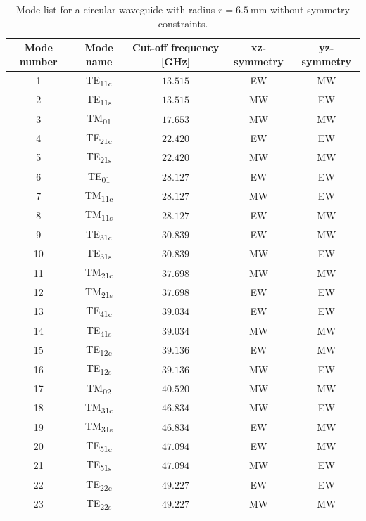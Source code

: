 \documentclass[english,twoside]{article}
\begin{document}
    
      \begin{table}[H]
        \centering		 
        \caption{Mode list for a circular waveguide with radius $r=\SI{6.5}{\milli\meter}$ without symmetry constraints.}
        \begin{tabular}{c|c|c|c|c}
          Mode number & Mode name & Cut-off frequency [GHz] & xz-symmetry & yz-symmetry\\
          \hline
          1 & TE\textsubscript{11c} & $\num{13.515}$ & EW & MW\\
          2 & TE\textsubscript{11s} & $\num{13.515}$ & MW & EW\\
          3 & TM\textsubscript{01} & $\num{17.653}$ & MW & MW\\
          4 & TE\textsubscript{21c} & $\num{22.420}$ & EW & EW\\
          5 & TE\textsubscript{21s} & $\num{22.420}$ & MW & MW\\
          6 & TE\textsubscript{01} & $\num{28.127}$ & EW & EW\\
          7 & TM\textsubscript{11c} & $\num{28.127}$ & MW & EW\\
          8 & TM\textsubscript{11s} & $\num{28.127}$ & EW & MW\\
          9 & TE\textsubscript{31c} & $\num{30.839}$ & EW & MW\\
          10 & TE\textsubscript{31s} & $\num{30.839}$ & MW & EW\\
          11 & TM\textsubscript{21c} & $\num{37.698}$ & MW & MW\\
          12 & TM\textsubscript{21s} & $\num{37.698}$ & EW & EW\\
          13 & TE\textsubscript{41c} & $\num{39.034}$ & EW & EW\\
          14 & TE\textsubscript{41s} & $\num{39.034}$ & MW & MW\\
          15 & TE\textsubscript{12c} & $\num{39.136}$ & EW & MW\\
          16 & TE\textsubscript{12s} & $\num{39.136}$ & MW & EW\\
          17 & TM\textsubscript{02} & $\num{40.520}$ & MW & MW\\
          18 & TM\textsubscript{31c} & $\num{46.834}$ & MW & EW\\
          19 & TM\textsubscript{31s} & $\num{46.834}$ & EW & MW\\
          20 & TE\textsubscript{51c} & $\num{47.094}$ & EW & MW\\
          21 & TE\textsubscript{51s} & $\num{47.094}$ & MW& EW\\
          22 & TE\textsubscript{22c} & $\num{49.227}$ & EW & EW\\
          23 & TE\textsubscript{22s} & $\num{49.227}$ & MW & MW			
        \end{tabular}
        \label{table:wc13}
      \end{table}
    
\end{document}
